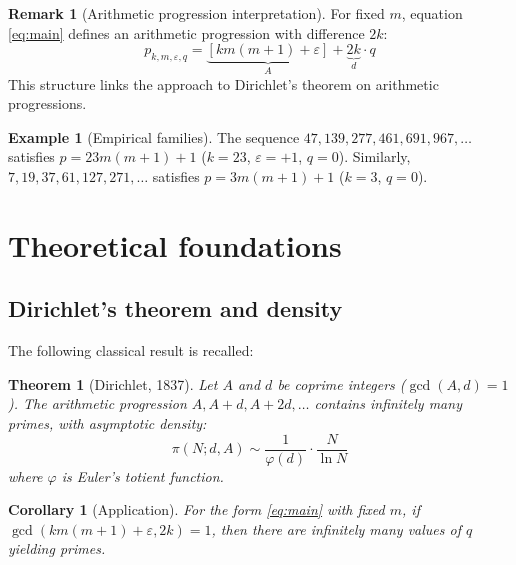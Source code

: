 \documentclass[11pt,a4paper]{article}
\theoremstyle{definition}
\newtheorem{remark}{Remark}[section]
\newtheorem{example}{Example}[section]
\theoremstyle{plain}
\newtheorem{theorem}{Theorem}[section]
\newtheorem{corollary}{Corollary}[section]
\begin{document}
\begin{remark}[Arithmetic progression interpretation]\label{rem:arith}
For fixed $m$, equation \eqref{eq:main} defines an arithmetic progression with difference $2k$:
\begin{equation}
p_{k,m,\varepsilon,q} = \underbrace{[km(m+1) + \varepsilon]}_{A} + \underbrace{2k}_{d} \cdot q
\end{equation}
This structure links the approach to Dirichlet's theorem on arithmetic progressions.
\end{remark}

\begin{example}[Empirical families]
The sequence $47, 139, 277, 461, 691, 967, \ldots$ satisfies $p = 23m(m+1) + 1$ ($k=23$, $\varepsilon=+1$, $q=0$). Similarly, $7, 19, 37, 61, 127, 271, \ldots$ satisfies $p = 3m(m+1) + 1$ ($k=3$, $q=0$).
\end{example}

\section{Theoretical foundations}

\subsection{Dirichlet's theorem and density}

The following classical result is recalled:

\begin{theorem}[Dirichlet, 1837]\label{thm:dirichlet}
Let $A$ and $d$ be coprime integers ($\gcd(A,d)=1$). The arithmetic progression $A, A+d, A+2d, \ldots$ contains infinitely many primes, with asymptotic density:
\begin{equation}\label{eq:dirichlet-density}
\pi(N; d, A) \sim \frac{1}{\varphi(d)} \cdot \frac{N}{\ln N}
\end{equation}
where $\varphi$ is Euler's totient function.
\end{theorem}

\begin{corollary}[Application]\label{cor:dirichlet-app}
For the form \eqref{eq:main} with fixed $m$, if $\gcd(km(m+1)+\varepsilon, 2k) = 1$, then there are infinitely many values of $q$ yielding primes.
\end{corollary}
\end{document}
